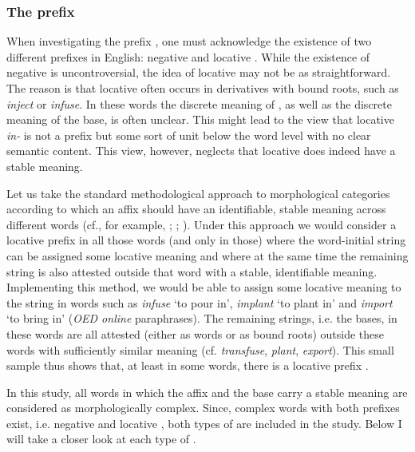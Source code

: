 \subsubsection{The prefix } \label{theory:in}

When investigating the prefix , one must acknowledge the existence of two different prefixes in English: negative  and locative . While the existence of negative  is uncontroversial, the idea of locative  may not be as straightforward. The reason is that locative  often occurs in derivatives with bound roots, such as \textit{inject} or \textit{infuse}. In these words the discrete meaning of , as well as the discrete meaning of the base, is often unclear. This might lead to the view that locative \textit{in-} is not a prefix but some sort of unit below the word level with  no clear semantic content. This view, however, neglects that locative  does indeed have a stable meaning.  

Let us take the standard methodological approach to morphological categories according to which an affix should have an identifiable, stable meaning across different words (cf., for example, \citealt[chapter 5.2.2]{Plag.1999}; \citealt[63 ff]{Stockwell.2001}; \citealt[68]{Schulte.2015}). Under this approach we would consider  a locative prefix in all those words (and only in those) where the word-initial string  can be assigned some locative meaning and where at the same time the remaining string is also attested outside that word with a stable, identifiable meaning.
Implementing this method, we would be able to assign some locative meaning to the string  in words such as \textit{infuse} `to pour in', \textit{implant} `to plant in' and \textit{import} `to bring in' (\textit{OED online} paraphrases). The remaining strings, i.e. the bases, in these words are all attested (either as words or as bound roots) outside these words with sufficiently similar meaning (cf. \textit{transfuse}, \textit{plant}, \textit{export}). This small sample thus shows that, at least in some words, there is a locative prefix . 


In this study, all words in which the affix and the base carry a stable meaning are considered as morphologically complex.  Since, complex words with both prefixes exist, i.e. negative and locative , both types of  are included in the study.  Below I will take a closer look at each type of .




